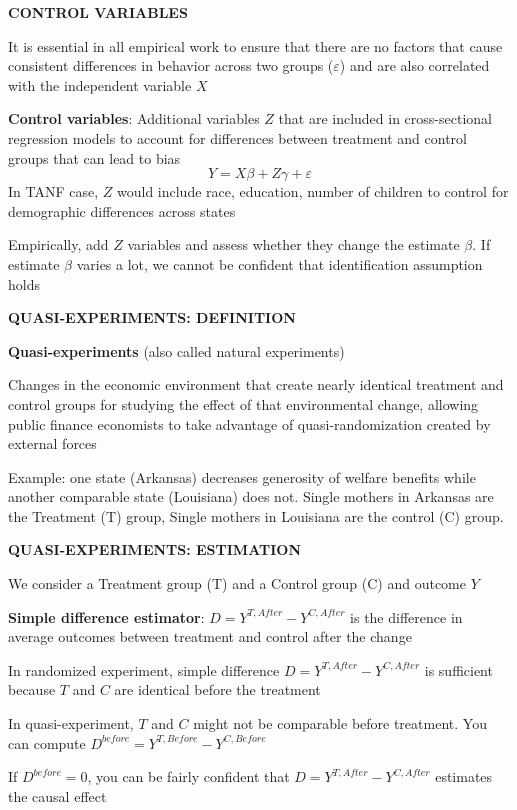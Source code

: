\documentclass[landscape]{slides}
\begin{document}
\begin{slide}
\begin{center}
{\bf CONTROL VARIABLES}
\end{center}
It is essential in all empirical work to ensure that there are no factors that cause consistent differences in behavior across two groups ($\varepsilon$) and are also correlated with the independent variable $X$

{\bf Control variables}:
Additional variables $Z$ that are included in cross-sectional regression models to account for differences between treatment and control groups that can lead to bias
\[Y = X \beta + Z \gamma + \varepsilon \]
In TANF case, $Z$ would include race, education, number of children to control for demographic differences
across states

Empirically, add $Z$ variables and assess whether they change the estimate $\beta$. If estimate $\beta$ varies a lot,
we cannot be confident that identification assumption holds

\end{slide}

\begin{slide}
\begin{center}
{\bf QUASI-EXPERIMENTS: DEFINITION}
\end{center}

{\bf Quasi-experiments} (also called natural experiments)

Changes in  the economic environment that create nearly identical treatment and control groups for studying the effect of that environmental
change, allowing public finance economists to take advantage of quasi-randomization created by external forces


Example: one state (Arkansas) decreases generosity of welfare benefits while another comparable state (Louisiana)
does not. Single mothers in Arkansas are the Treatment (T) group, Single mothers in Louisiana are the control (C) group.

\end{slide}

\begin{slide}
\begin{center}
{\bf QUASI-EXPERIMENTS: ESTIMATION}
\end{center}
We consider a Treatment group (T) and a Control group (C) and outcome $Y$

{\bf Simple difference estimator}:  $D=Y^{T, After} - Y^{C, After} $ is the difference in average outcomes between treatment
and control after the change

In randomized experiment, simple difference $D=Y^{T, After} - Y^{C, After}$ is sufficient because $T$ and $C$ are identical before the treatment

In quasi-experiment, $T$ and $C$ might not be comparable before treatment. You can compute
$D^{before} = Y^{T, Before} - Y^{C, Before} $

If $D^{before}=0$, you can be fairly confident that $D=Y^{T, After} - Y^{C, After} $ estimates the causal effect

\end{slide}
\end{document}
